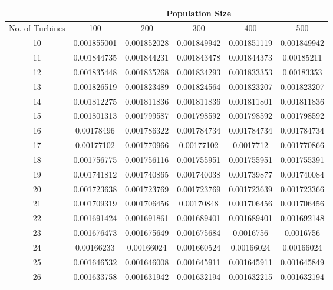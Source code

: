     \singlespacing
    \begin{table}[H]
        \centering
        \begin{tabular}{|c|c|c|c|c|c|} \hline
            \textbf{} & \multicolumn{5}{c|}{\textbf{Population Size}} \\ \hline
No. of Turbines     & 100     & 200     & 300     & 400    & 500    \\ \hline
10	 & 	0.001855001	 & 	0.001852028	 & 	0.001849942	 & 	0.001851119	 & 	0.001849942	 \\ \hline
11	 & 	0.001844735	 & 	0.001844231	 & 	0.001843478	 & 	0.001844373	 & 	0.00185211	 \\ \hline
12	 & 	0.001835448	 & 	0.001835268	 & 	0.001834293	 & 	0.001833353	 & 	0.00183353	 \\ \hline
13	 & 	0.001826519	 & 	0.001823489	 & 	0.001824564	 & 	0.001823207	 & 	0.001823207	 \\ \hline
14	 & 	0.001812275	 & 	0.001811836	 & 	0.001811836	 & 	0.001811801	 & 	0.001811836	 \\ \hline
15	 & 	0.001801313	 & 	0.001799587	 & 	0.001798592	 & 	0.001798592	 & 	0.001798592	 \\ \hline
16	 & 	0.00178496	 & 	0.001786322	 & 	0.001784734	 & 	0.001784734	 & 	0.001784734	 \\ \hline
17	 & 	0.00177102	 & 	0.001770966	 & 	0.00177102	 & 	0.0017712	 & 	0.001770866	 \\ \hline
18	 & 	0.001756775	 & 	0.001756116	 & 	0.001755951	 & 	0.001755951	 & 	0.001755391	 \\ \hline
19	 & 	0.001741812	 & 	0.001740865	 & 	0.001740038	 & 	0.001739877	 & 	0.001740084	 \\ \hline
20	 & 	0.001723638	 & 	0.001723769	 & 	0.001723769	 & 	0.001723639	 & 	0.001723366	 \\ \hline
21	 & 	0.001709319	 & 	0.001706456	 & 	0.00170848	 & 	0.001706456	 & 	0.001706456	 \\ \hline
22	 & 	0.001691424	 & 	0.001691861	 & 	0.001689401	 & 	0.001689401	 & 	0.001692148	 \\ \hline
23	 & 	0.001676473	 & 	0.001675649	 & 	0.001675684	 & 	0.0016756	 & 	0.0016756	 \\ \hline
24	 & 	0.00166233	 & 	0.00166024	 & 	0.001660524	 & 	0.00166024	 & 	0.00166024	 \\ \hline
25	 & 	0.001646532	 & 	0.001646008	 & 	0.001645911	 & 	0.001645911	 & 	0.001645849	 \\ \hline
26	 & 	0.001633758	 & 	0.001631942	 & 	0.001632194	 & 	0.001632215	 & 	0.001632194	 \\ \hline

\end{tabular}
\end{table}
